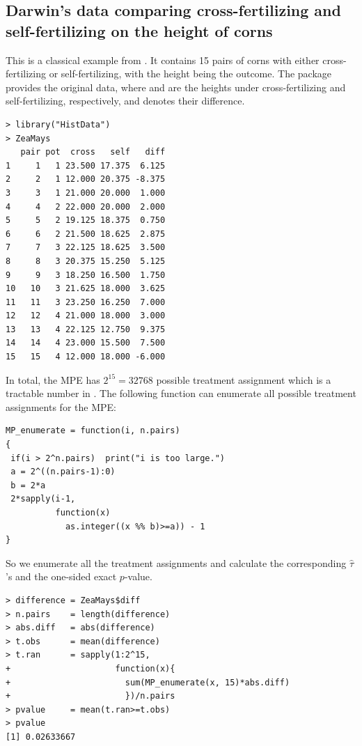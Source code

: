 \subsection{Darwin's data comparing cross-fertilizing and self-fertilizing on the height of corns}
\label{sec::frt-darwin-mpe}

This is a classical example from \citet{Fisher:1935}. It contains 15 pairs of corns with either cross-fertilizing or self-fertilizing, with the height being the outcome. The  package  provides the original data, where  and  are the heights under cross-fertilizing and self-fertilizing, respectively, and  denotes their difference. 

\begin{lstlisting}
> library("HistData")
> ZeaMays
   pair pot  cross   self   diff
1     1   1 23.500 17.375  6.125
2     2   1 12.000 20.375 -8.375
3     3   1 21.000 20.000  1.000
4     4   2 22.000 20.000  2.000
5     5   2 19.125 18.375  0.750
6     6   2 21.500 18.625  2.875
7     7   3 22.125 18.625  3.500
8     8   3 20.375 15.250  5.125
9     9   3 18.250 16.500  1.750
10   10   3 21.625 18.000  3.625
11   11   3 23.250 16.250  7.000
12   12   4 21.000 18.000  3.000
13   13   4 22.125 12.750  9.375
14   14   4 23.000 15.500  7.500
15   15   4 12.000 18.000 -6.000
\end{lstlisting}
 


In total, the MPE has $2^{15} = 32768$ possible treatment assignment which is a tractable number in . The following function can enumerate all possible treatment assignments for the MPE:

\begin{lstlisting}
MP_enumerate = function(i, n.pairs) 
{
 if(i > 2^n.pairs)  print("i is too large.")
 a = 2^((n.pairs-1):0)
 b = 2*a
 2*sapply(i-1, 
          function(x) 
            as.integer((x %% b)>=a)) - 1
}
\end{lstlisting}



So we enumerate all the treatment assignments and calculate the corresponding $\hat{\tau}$'s and the one-sided exact $p$-value. 

\begin{lstlisting}
> difference = ZeaMays$diff 
> n.pairs    = length(difference)
> abs.diff   = abs(difference)
> t.obs      = mean(difference)
> t.ran      = sapply(1:2^15, 
+                     function(x){ 
+                       sum(MP_enumerate(x, 15)*abs.diff) 
+                       })/n.pairs
> pvalue     = mean(t.ran>=t.obs)
> pvalue
[1] 0.02633667
\end{lstlisting}

